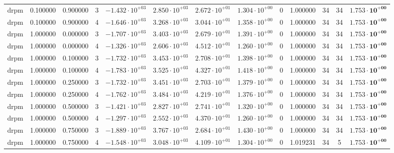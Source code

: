 \begin{table}
\begin{tabular}{ccccccccccccc}
drpm & 0.100000 & 0.900000 & 3 & $-1.432 \cdot 10^{+03}$ & $2.850 \cdot 10^{+03}$ & $2.672 \cdot 10^{+01}$ & $1.304 \cdot 10^{+00}$ & 0 & 1.000000 & 34 & 34 & $\mathbf{1.753 \cdot 10^{+00}}$ \\
drpm & 0.100000 & 0.900000 & 4 & $-1.646 \cdot 10^{+03}$ & $3.268 \cdot 10^{+03}$ & $3.044 \cdot 10^{+01}$ & $1.358 \cdot 10^{+00}$ & 0 & 1.000000 & 34 & 34 & $\mathbf{1.753 \cdot 10^{+00}}$ \\
drpm & 1.000000 & 0.000000 & 3 & $-1.707 \cdot 10^{+03}$ & $3.403 \cdot 10^{+03}$ & $2.679 \cdot 10^{+01}$ & $1.391 \cdot 10^{+00}$ & 0 & 1.000000 & 34 & 34 & $\mathbf{1.753 \cdot 10^{+00}}$ \\
drpm & 1.000000 & 0.000000 & 4 & $-1.326 \cdot 10^{+03}$ & $2.606 \cdot 10^{+03}$ & $4.512 \cdot 10^{+01}$ & $1.260 \cdot 10^{+00}$ & 0 & 1.000000 & 34 & 34 & $\mathbf{1.753 \cdot 10^{+00}}$ \\
drpm & 1.000000 & 0.100000 & 3 & $-1.732 \cdot 10^{+03}$ & $3.453 \cdot 10^{+03}$ & $2.708 \cdot 10^{+01}$ & $1.398 \cdot 10^{+00}$ & 0 & 1.000000 & 34 & 34 & $\mathbf{1.753 \cdot 10^{+00}}$ \\
drpm & 1.000000 & 0.100000 & 4 & $-1.783 \cdot 10^{+03}$ & $3.525 \cdot 10^{+03}$ & $4.327 \cdot 10^{+01}$ & $1.418 \cdot 10^{+00}$ & 0 & 1.000000 & 34 & 34 & $\mathbf{1.753 \cdot 10^{+00}}$ \\
drpm & 1.000000 & 0.250000 & 3 & $-1.732 \cdot 10^{+03}$ & $3.451 \cdot 10^{+03}$ & $2.703 \cdot 10^{+01}$ & $1.379 \cdot 10^{+00}$ & 0 & 1.000000 & 34 & 34 & $\mathbf{1.753 \cdot 10^{+00}}$ \\
drpm & 1.000000 & 0.250000 & 4 & $-1.762 \cdot 10^{+03}$ & $3.484 \cdot 10^{+03}$ & $4.219 \cdot 10^{+01}$ & $1.376 \cdot 10^{+00}$ & 0 & 1.000000 & 34 & 34 & $\mathbf{1.753 \cdot 10^{+00}}$ \\
drpm & 1.000000 & 0.500000 & 3 & $-1.421 \cdot 10^{+03}$ & $2.827 \cdot 10^{+03}$ & $2.741 \cdot 10^{+01}$ & $1.320 \cdot 10^{+00}$ & 0 & 1.000000 & 34 & 34 & $\mathbf{1.753 \cdot 10^{+00}}$ \\
drpm & 1.000000 & 0.500000 & 4 & $-1.297 \cdot 10^{+03}$ & $2.552 \cdot 10^{+03}$ & $4.370 \cdot 10^{+01}$ & $1.260 \cdot 10^{+00}$ & 0 & 1.000000 & 34 & 34 & $\mathbf{1.753 \cdot 10^{+00}}$ \\
drpm & 1.000000 & 0.750000 & 3 & $-1.889 \cdot 10^{+03}$ & $3.767 \cdot 10^{+03}$ & $2.684 \cdot 10^{+01}$ & $1.430 \cdot 10^{+00}$ & 0 & 1.000000 & 34 & 34 & $\mathbf{1.753 \cdot 10^{+00}}$ \\
drpm & 1.000000 & 0.750000 & 4 & $-1.548 \cdot 10^{+03}$ & $3.048 \cdot 10^{+03}$ & $4.109 \cdot 10^{+01}$ & $1.304 \cdot 10^{+00}$ & 0 & 1.019231 & 34 & 5 & $\mathbf{1.753 \cdot 10^{+00}}$ \\

\end{tabular}
\end{table}
